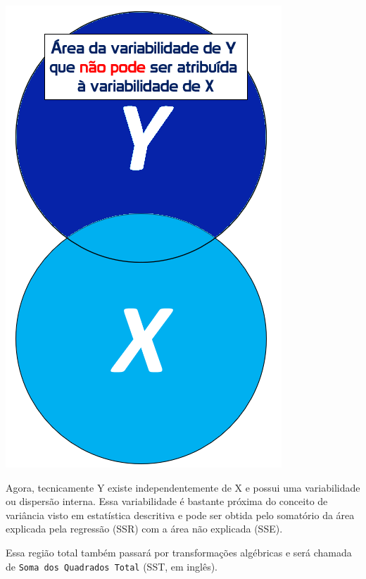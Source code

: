 \documentclass[
]{book}
\begin{document}
\includegraphics{./img/cap_reg_x_y_SSE.png}

Agora, tecnicamente Y existe independentemente de X e possui uma
variabilidade ou dispersão interna. Essa variabilidade é bastante
próxima do conceito de variância visto em estatística descritiva e pode
ser obtida pelo somatório da área explicada pela regressão (SSR) com a
área não explicada (SSE).

Essa região total também passará por transformações algébricas e será
chamada de \texttt{Soma\ dos\ Quadrados\ Total} (SST, em inglês).
\end{document}
